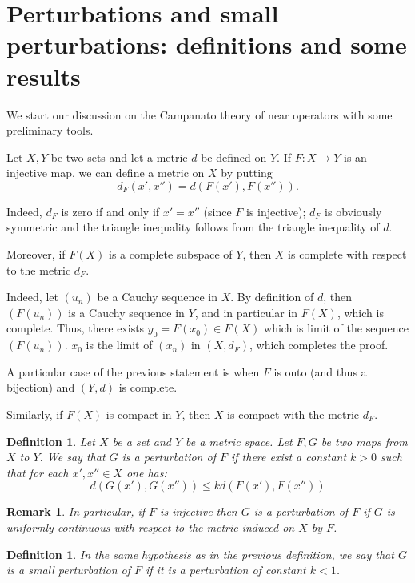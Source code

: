 \documentclass[12pt]{article}
\theoremstyle{normale}
\theoremstyle{liscio}
\newtheorem{remark}[theorem]{Remark}
\newtheorem{definition}[theorem]{Definition}
\begin{document}
\tableofcontents

\section{Perturbations and small perturbations: definitions and
some results}

We start our discussion on the Campanato theory of near operators
with some preliminary tools.

Let $X, Y$ be two sets and let a metric $d$ be defined on $Y$. If
$F\colon X\to Y$ is an injective map, we can define a metric on $X$ by
putting
\[
d_F(x', x'') = d(F(x'),F(x'')).
\]

Indeed, $d_F$ is zero if and only if $x'=x''$ (since $F$ is
injective); $d_F$ is obviously symmetric and the triangle
inequality follows from the triangle inequality of $d$.

Moreover, if $F(X)$ is a complete subspace of $Y$, then $X$ is
complete with respect to the metric $d_F$.

Indeed, let $(u_n)$ be a Cauchy sequence in $X$. By definition of
$d$, then $(F(u_n))$ is a Cauchy sequence in $Y$, and in
particular in $F(X)$, which is complete. Thus, there exists $y_0
= F(x_0) \in F(X)$ which is limit of the sequence $(F(u_n))$.
$x_0$ is the limit of $(x_n)$ in $(X, d_F)$, which completes the
proof.

A particular case of the previous statement is when $F$ is onto
(and thus a bijection) and $(Y,d)$ is complete.

Similarly, if $F(X)$ is compact in $Y$, then $X$ is compact with
the metric $d_F$.

\begin{definition}
Let $X$ be a set and $Y$ be a metric space. Let $F, G$ be two maps
from $X$ to $Y$. We say that $G$ is a perturbation of $F$ if there
exist a constant $k>0$ such that for each $x', x'' \in X$ one has:
\[
d(G(x'), G(x'')) \le k d(F(x'), F(x''))
\]
\end{definition}

\begin{remark}\label{gcont}
In particular, if $F$ is injective then $G$ is a perturbation of
$F$ if $G$ is uniformly continuous with respect to the metric induced on
$X$ by $F$.
\end{remark}

\begin{definition}
In the same hypothesis as in the previous definition, we say that
$G$ is a small perturbation of $F$ if it is a perturbation of
constant $k<1$.
\end{definition}
\end{document}
